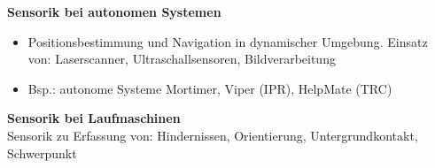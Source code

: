 \textbf{Sensorik bei autonomen Systemen}
\begin{itemize}
\item Positionsbestimmung und Navigation in dynamischer Umgebung. Einsatz von: Laserscanner, Ultraschallsensoren, Bildverarbeitung
\item Bsp.: autonome Systeme Mortimer, Viper (IPR), HelpMate (TRC)
\end{itemize}

\textbf{Sensorik bei Laufmaschinen} \\ Sensorik zu Erfassung von: Hindernissen, Orientierung, Untergrundkontakt, Schwerpunkt







